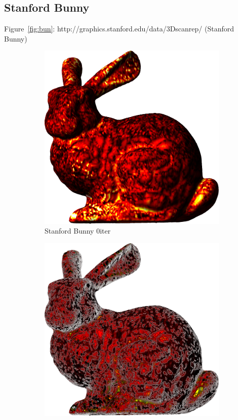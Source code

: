 \subsection{Stanford Bunny}
Figure~\ref{fig:bun}: http://graphics.stanford.edu/data/3Dscanrep/ (Stanford Bunny)
\begin{figure}[ht]
\ffigbox
	{\begin{subfigure}[b]{0.48\linewidth}
		\includegraphics[width=1.0\linewidth,height=0.3\textheight,keepaspectratio]{data/acquired_meshes/bun_zipper_edited_r1_n4_v256_funcvals_0iter.png}
		\caption{Stanford Bunny 0iter}\label{fig:bun.a}
	\end{subfigure}
	\begin{subfigure}[b]{0.48\linewidth}
		\includegraphics[width=1.0\linewidth,height=0.3\textheight,keepaspectratio]{data/acquired_meshes/bun_zipper_edited_r1_n4_v256_funcvals_isolines_0iter.png}

\end{subfigure}}
\end{figure}
